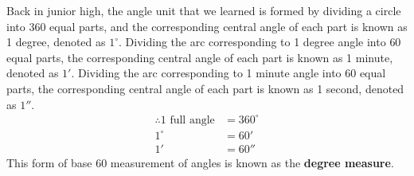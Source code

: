 \documentclass{report}
\begin{document}
Back in junior high, the angle unit that we learned is formed by dividing a circle into $360$ equal parts, and the corresponding central angle of each part is known as 1 degree, denoted as $1^\circ$. Dividing the arc corresponding to 1 degree angle into $60$ equal parts, the corresponding central angle of each part is known as 1 minute, denoted as $1'$. Dividing the arc corresponding to 1 minute angle into $60$ equal parts, the corresponding central angle of each part is known as 1 second, denoted as $1''$.
\begin{align*}
	\therefore 1 \text{ full angle} & = 360^\circ \\
	1^\circ                         & = 60'       \\
	1'                              & = 60''      
\end{align*}
This form of base 60 measurement of angles is known as the \textbf{degree measure}.
\end{document}
